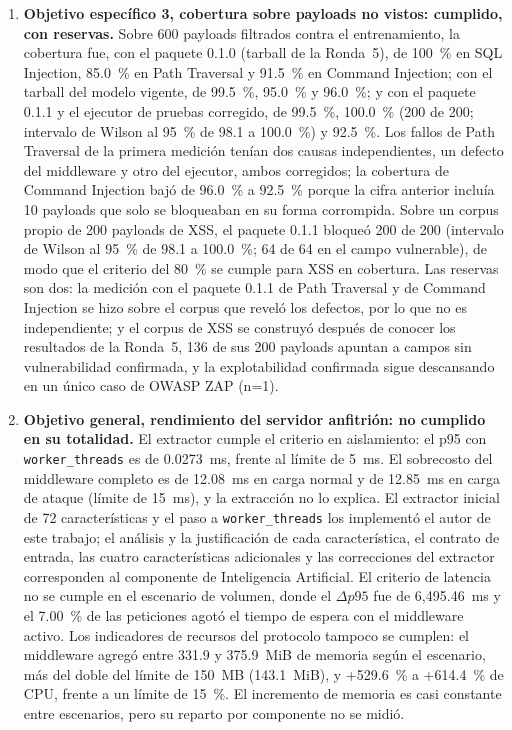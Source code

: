\begin{enumerate}
    \item \textbf{Objetivo específico 3, cobertura sobre payloads no vistos: cumplido, con reservas.}\label{conc:cobertura}
    Sobre 600 payloads filtrados contra el entrenamiento, la cobertura fue, con el paquete 0.1.0
    (tarball de la Ronda~5), de 100~\% en SQL Injection, 85.0~\% en Path Traversal y 91.5~\% en
    Command Injection; con el tarball del modelo vigente, de 99.5~\%, 95.0~\% y 96.0~\%; y con el
    paquete 0.1.1 y el ejecutor de pruebas corregido, de 99.5~\%, 100.0~\% (200 de 200; intervalo de
    Wilson al 95~\% de 98.1 a 100.0~\%) y 92.5~\%. Los fallos de Path Traversal de la primera
    medición tenían dos causas independientes, un defecto del middleware y otro del ejecutor, ambos
    corregidos; la cobertura de Command Injection bajó de 96.0~\% a 92.5~\% porque la cifra anterior
    incluía 10 payloads que solo se bloqueaban en su forma corrompida. Sobre un corpus propio de 200
    payloads de XSS, el paquete 0.1.1 bloqueó 200 de 200 (intervalo de Wilson al 95~\% de 98.1 a
    100.0~\%; 64 de 64 en el campo vulnerable), de modo que el criterio del 80~\% se cumple para
    XSS en cobertura. Las reservas son dos: la medición con el paquete 0.1.1 de Path Traversal y de
    Command Injection se hizo sobre el corpus que reveló los defectos, por lo que no es
    independiente; y el corpus de XSS se construyó después de conocer los resultados de la Ronda~5,
    136 de sus 200 payloads apuntan a campos sin vulnerabilidad confirmada, y la explotabilidad
    confirmada sigue descansando en un único caso de OWASP ZAP (n=1).

    \item \textbf{Objetivo general, rendimiento del servidor anfitrión: no cumplido en su
    totalidad.}\label{conc:rendimiento} El extractor cumple el criterio en aislamiento: el p95 con
    \texttt{worker\_threads} es de 0.0273~ms, frente al límite de 5~ms. El sobrecosto del middleware
    completo es de 12.08~ms en carga normal y de 12.85~ms en carga de ataque (límite de 15~ms), y la
    extracción no lo explica. El extractor inicial de 72 características y el paso a
    \texttt{worker\_threads} los implementó el autor de este trabajo; el análisis y la justificación
    de cada característica, el contrato de entrada, las cuatro características adicionales y las
    correcciones del extractor corresponden al componente de Inteligencia Artificial. El criterio
    de latencia no se cumple en el escenario de volumen, donde el $\Delta p95$ fue de 6{,}495.46~ms
    y el 7.00~\% de las peticiones agotó el tiempo de espera con el middleware activo. Los
    indicadores de recursos del protocolo tampoco se cumplen: el middleware agregó entre 331.9 y
    375.9~MiB de memoria según el escenario, más del doble del límite de 150~MB (143.1~MiB), y
    +529.6~\% a +614.4~\% de CPU, frente a un límite de 15~\%. El incremento de memoria es casi
    constante entre escenarios, pero su reparto por componente no se midió.


\end{enumerate}
